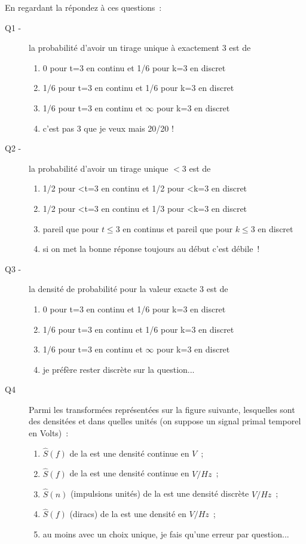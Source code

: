 \begin{quizz}

  
  En regardant la  répondez à ces questions~:
  \begin{description}
  \item[Q1 -] la probabilité d'avoir un tirage unique à exactement 3 est de 
    \begin{enumerate}
    \item 0 pour t=3 en continu et 1/6 pour k=3 en discret
    \item 1/6 pour t=3 en continu et 1/6 pour k=3 en discret
    \item 1/6 pour t=3 en continu et $\infty$ pour k=3 en discret
    \item c'est pas 3 que je veux mais 20/20 !
    \end{enumerate}
  \item[Q2 -] la probabilité d'avoir un tirage unique $ <3$ est de 
    \begin{enumerate}
    \item 1/2 pour <t=3 en continu et 1/2 pour <k=3 en discret
    \item 1/2 pour <t=3 en continu et 1/3 pour <k=3 en discret
    \item pareil que pour $t\leq3$ en continus et pareil que pour $k\leq3$ en discret
    \item si on met la bonne réponse toujours au début c'est débile~!
    \end{enumerate}
   \item[Q3 -] la densité de probabilité pour la valeur exacte 3 est de 
    \begin{enumerate}
    \item 0 pour t=3 en continu et 1/6 pour k=3 en discret
    \item 1/6 pour t=3 en continu et 1/6 pour k=3 en discret
    \item 1/6 pour t=3 en continu et $\infty$ pour k=3 en discret
    \item je préfère rester discrète sur la question...
    \end{enumerate}
  \item[Q4] Parmi les transformées représentées sur la figure suivante, lesquelles sont des densitées et dans quelles unités (on suppose un signal primal temporel en Volts)~:
    \begin{enumerate}
    \item $\hat{S}(f)$ de la \TF{} est une densité continue en $V$~;
    \item $\hat{S}(f)$ de la \TF{} est une densité continue en $V/Hz$~;
    \item $\hat{S}(n)$ (impulsions unités) de la \sdf{} est une densité discrète $V/Hz$~;
    \item $\hat{S}(f)$ (diracs) de la \sdf{} est une densité en $V/Hz$~;
    \item au moins avec un choix unique, je fais qu'une erreur par question...
    \end{enumerate}

\end{description}
\end{quizz}

